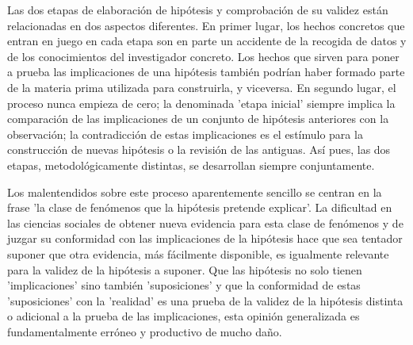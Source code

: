 Las dos etapas de elaboración de hipótesis y comprobación de su validez están relacionadas en dos aspectos diferentes. En primer lugar, los hechos concretos que entran en juego en cada etapa son en parte un accidente de la recogida de datos y de los conocimientos del investigador concreto. Los hechos que sirven para poner a prueba las implicaciones de una hipótesis también podrían haber formado parte de la materia prima utilizada para construirla, y viceversa. En segundo lugar, el proceso nunca empieza de cero; la denominada 'etapa inicial' siempre implica la comparación de las implicaciones de un conjunto de hipótesis anteriores con la observación; la contradicción de estas implicaciones es el estímulo para la construcción de nuevas hipótesis o la revisión de las antiguas. Así pues, las dos etapas, metodológicamente distintas, se desarrollan siempre conjuntamente.

Los malentendidos sobre este proceso aparentemente sencillo se centran en la frase 'la clase de fenómenos que la hipótesis pretende explicar'. La dificultad en las ciencias sociales de obtener nueva evidencia para esta clase de fenómenos y de juzgar su conformidad con las implicaciones de la hipótesis hace que sea tentador suponer que otra evidencia, más fácilmente disponible, es igualmente relevante para la validez de la hipótesis a suponer. Que las hipótesis no solo tienen 'implicaciones' sino también 'suposiciones' y que la conformidad de estas 'suposiciones' con la 'realidad' es una prueba de la validez de la hipótesis distinta o adicional a la prueba de las implicaciones, esta opinión generalizada es fundamentalmente erróneo y productivo de mucho daño.\\

